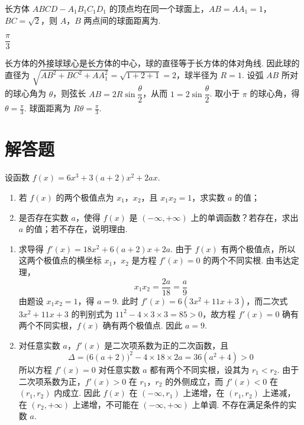 \begin{problem}
长方体 \(ABCD - A_{1}B_{1}C_{1}D_{1}\) 的顶点均在同一个球面上，\(AB = AA_{1} = 1\)，\(BC = \sqrt{2}\)，则 \(A\)，\(B\) 两点间的球面距离为\fillinblank{}.

\end{problem}

\begin{answer}
\(\dfrac{\pi}{3}\)
\end{answer}

\begin{solution}
长方体的外接球球心是长方体的中心，球的直径等于长方体的体对角线. 因此球的直径为 \(\sqrt{AB^{2}+BC^{2}+AA_{1}^{2}}=\sqrt{1+2+1}=2\)，球半径为 \(R=1\). 设弧 \(AB\) 所对的球心角为 \(\theta\)，则弦长 \(AB=2R\sin\dfrac{\theta}{2}\)，从而 \(1=2\sin\dfrac{\theta}{2}\). 取小于 \(\pi\) 的球心角，得 \(\theta=\frac{\pi}{3}\). 球面距离为 \(R\theta=\frac{\pi}{3}\).
\end{solution}

\section{解答题}

\begin{problem}
设函数 \(f(x) = 6x^{3} + 3(a + 2)x^{2} + 2ax\).
\begin{enumerate}
\item 若 \(f(x)\) 的两个极值点为 \(x_{1}\)，\(x_{2}\)，且 \(x_{1}x_{2} = 1\)，求实数 \(a\) 的值；
\item 是否存在实数 \(a\)，使得 \(f(x)\) 是 \((-\infty, +\infty)\) 上的单调函数？若存在，求出 \(a\) 的值；若不存在，说明理由.
\end{enumerate}
\end{problem}

\begin{solution}
\begin{enumerate}
\item 求导得 \(f'(x)=18x^{2}+6(a+2)x+2a\). 由于 \(f(x)\) 有两个极值点，所以这两个极值点的横坐标 \(x_{1}\)，\(x_{2}\) 是方程 \(f'(x)=0\) 的两个不同实根. 由韦达定理，
\[
x_{1}x_{2}=\frac{2a}{18}=\frac{a}{9}
\]
由题设 \(x_{1}x_{2}=1\)，得 \(a=9\). 此时 \(f'(x)=6(3x^{2}+11x+3)\)，而二次式 \(3x^{2}+11x+3\) 的判别式为 \(11^{2}-4\times3\times3=85>0\)，故方程 \(f'(x)=0\) 确有两个不同实根，\(f(x)\) 确有两个极值点. 因此 \(a=9\).

\item 对任意实数 \(a\)，\(f'(x)\) 是二次项系数为正的二次函数，且
\[
\Delta=\bigl(6(a+2)\bigr)^{2}-4\times18\times2a=36(a^{2}+4)>0
\]
所以方程 \(f'(x)=0\) 对任意实数 \(a\) 都有两个不同实根，设其为 \(r_{1}<r_{2}\). 由于二次项系数为正，\(f'(x)>0\) 在 \(r_{1}\)，\(r_{2}\) 的外侧成立，而 \(f'(x)<0\) 在 \((r_{1},r_{2})\) 内成立. 因此 \(f(x)\) 在 \((-\infty,r_{1})\) 上递增，在 \((r_{1},r_{2})\) 上递减，在 \((r_{2},+\infty)\) 上递增，不可能在 \((-\infty,+\infty)\) 上单调. 不存在满足条件的实数 \(a\).
\end{enumerate}
\end{solution}

